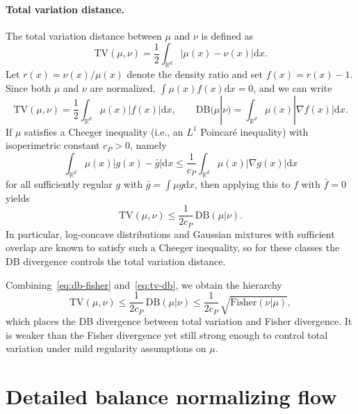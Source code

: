 \documentclass{article}
\newcommand{\Le}{\leqslant}
\newcommand{\D}{\mathrm{d}}
\newcommand{\DB}{\mathrm{DB}}
\newcommand{\TV}{\mathrm{TV}}
\newcommand{\Fish}{\mathrm{Fisher}}
\theoremstyle{plain}
\begin{document}
\paragraph{Total variation distance.}
The total variation distance between $\mu$ and $\nu$ is defined as
\begin{equation*}
    \TV(\mu, \nu) = \frac{1}{2} \int_{\mathbb R^d} |\mu(x) - \nu(x)| \D x.
\end{equation*}
Let $r(x) = \nu(x)/\mu(x)$ denote the density ratio and set $f(x) = r(x) - 1$. Since both $\mu$ and $\nu$ are normalized, $\int \mu(x) f(x) \D x = 0$, and we can write
\begin{equation*}
    \TV(\mu, \nu) = \frac{1}{2} \int_{\mathbb R^d} \mu(x) |f(x)| \D x, \qquad \DB(\mu | \nu) = \int_{\mathbb R^d} \mu(x) |\nabla f(x)| \D x.
\end{equation*}
If $\mu$ satisfies a Cheeger inequality (i.e., an $L^1$ Poincar\'{e} inequality) with isoperimetric constant $c_{P} > 0$, namely
\begin{equation*}
    \int_{\mathbb R^d} \mu(x) |g(x) - \bar g| \D x \Le \frac{1}{c_{P}} \int_{\mathbb R^d} \mu(x) |\nabla g(x)| \D x
\end{equation*}
for all sufficiently regular $g$ with $\bar g = \int \mu g \D x$, then applying this to $f$ with $\bar f = 0$ yields
\begin{equation}\label{eq:tv-db}
    \TV(\mu, \nu) \Le \frac{1}{2c_{P}}\, \DB(\mu | \nu).
\end{equation}
In particular, log-concave distributions and Gaussian mixtures with sufficient overlap are known to satisfy such a Cheeger inequality, so for these classes the DB divergence controls the total variation distance.

Combining~\eqref{eq:db-fisher} and~\eqref{eq:tv-db}, we obtain the hierarchy
\begin{equation}\label{eq:hierarchy}
    \TV(\mu, \nu) \Le \frac{1}{2c_{P}}\, \DB(\mu | \nu) \Le \frac{1}{2c_{P}}\, \sqrt{\Fish(\nu | \mu)},
\end{equation}
which places the DB divergence between total variation and Fisher divergence. It is weaker than the Fisher divergence yet still strong enough to control total variation under mild regularity assumptions on $\mu$.

\section{Detailed balance normalizing flow}
\end{document}
